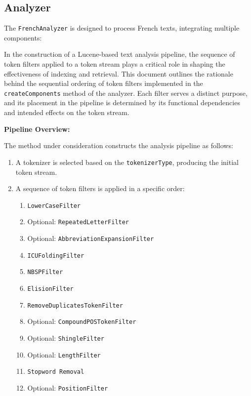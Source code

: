\subsection{Analyzer}
The \texttt{FrenchAnalyzer} is designed to process French texts, integrating multiple components:

In the construction of a Lucene-based text analysis pipeline, the sequence of token filters applied to a token stream plays a critical role in shaping the effectiveness of indexing and retrieval. This document outlines the rationale behind the sequential ordering of token filters implemented in the \texttt{createComponents} method of the analyzer. Each filter serves a distinct purpose, and its placement in the pipeline is determined by its functional dependencies and intended effects on the token stream.

\textbf{ Pipeline Overview:}

The method under consideration constructs the analysis pipeline as follows:

\begin{enumerate}
    \item A tokenizer is selected based on the \texttt{tokenizerType}, producing the initial token stream.
    \item A sequence of token filters is applied in a specific order:
    \begin{enumerate}
        \item \texttt{LowerCaseFilter}
        \item Optional: \texttt{RepeatedLetterFilter}
        \item Optional: \texttt{AbbreviationExpansionFilter}
        \item \texttt{ICUFoldingFilter}
        \item \texttt{NBSPFilter}
        \item \texttt{ElisionFilter}
        \item \texttt{RemoveDuplicatesTokenFilter}
        \item Optional: \texttt{CompoundPOSTokenFilter}
        \item Optional: \texttt{ShingleFilter}
        \item Optional: \texttt{LengthFilter}
        \item \texttt{Stopword Removal}
        \item Optional: \texttt{PositionFilter}
    \end{enumerate}
\end{enumerate}


